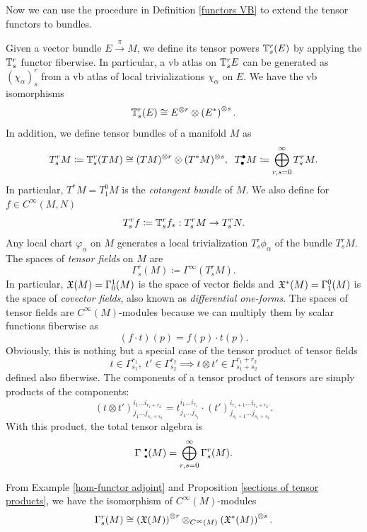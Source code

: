 Now we can use the procedure in Definition \ref{functors VB} to extend the tensor functors to bundles.

\begin{defn}
    Given a vector bundle $E\overset{\pi}{\to}M$, we define its tensor powers $\mathbb{T}^r_s (E)$ by applying the $\mathbb{T}^r_s$ functor fiberwise. In particular, a \gls{vb} atlas on $\mathbb{T}^r_s E$ can be generated as $(\chi_\alpha)^r_s$ from a \gls{vb} atlas of local trivializations $\chi_\alpha$ on $E$.
    We have the \gls{vb} isomorphisms
    \[
    \mathbb{T}^r_s (E)\cong E^{\otimes r}\otimes \left(E^\ast\right)^{\otimes s}.
    \]
    In addition, we define tensor bundles of a manifold $M$ as
    \[
    T^r_s M\coloneqq \mathbb{T}^r_s (TM)\cong (TM)^{\otimes r}\otimes (T^\ast M)^{\otimes s},\;\; T^\bullet_\bullet M\coloneqq \bigoplus_{r,s=0}^\infty T^r_s M.
    \]
    In particular, $T^\ast M=T^0_1 M$ is the \emph{cotangent bundle} of $M$. We also define for $f\in C^\infty(M,N)$ 
    \[ T^r_s f\coloneqq \mathbb{T}^r_s f_\ast: T^r_s M\to T^r_s N.\]
    Any local chart $\varphi_\alpha$ on $M$ generates a local trivialization $T^r_s \phi_\alpha$ of the bundle $T^r_s M$.
    The spaces of \emph{tensor fields} on $M$ are 
    \[
    \Gamma^r_s(M)\coloneqq \Gamma^\infty(T^r_s M).
    \]
    In particular, $\mathfrak{X}(M)=\Gamma^1_0(M)$ is the space of vector fields and $\mathfrak{X}^\ast(M)=\Gamma^0_1(M)$ is the space of \emph{covector fields}, also known as \emph{differential one-forms}. The spaces of tensor fields are $C^\infty(M)$-modules because we can multiply them by scalar functions fiberwise as
    \[
    (f\cdot t)(p)=f(p)\cdot t(p).
    \]
    Obviously, this is nothing but a special case of the tensor product of tensor fields
    \[t\in\Gamma^{r_1}_{s_1},\;t'\in\Gamma^{r_2}_{s_2}\implies t\otimes t' \in \Gamma^{r_1+r_2}_{s_1+s_2}\] defined also fiberwise. The components of a tensor product of tensors are simply products of the components:
    \[
    (t\otimes t')_{j_1 \ldots j_{s_1+s_2}}^{i_1\ldots i_{r_1+r_2}}=t_{j_1\ldots j_{s_1}}^{i_1\ldots i_{r_1}}\cdot (t')^{i_{r_1+1}\ldots i_{r_1+r_2}}_{j_{s_1+1}\ldots j_{s_1+s_2}}.
    \]
    With this product, the total tensor algebra is 
    \[\Gamma^{\smbullet }_{\smbullet }(M)=\bigoplus_{r,s=0}^\infty \Gamma^r_s(M).\]
\end{defn}


\begin{cor}
    From Example \ref{hom-functor adjoint} and Proposition \ref{sections of tensor products}, we have the isomorphism of $C^\infty(M)$-modules
    \[\Gamma^r_s (M)\cong \left(\mathfrak{X}(M)\right)^{\otimes r} \otimes_{C^\infty(M)}\left(\mathfrak{X}^\ast(M)\right)^{\otimes s}.\]
\end{cor}

